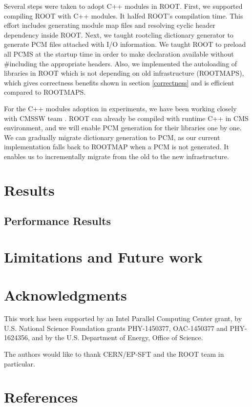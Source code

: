 \documentclass[12pt]{iopart}
\begin{document}
Several steps were taken to adopt C++ modules in ROOT. First, we supported compiling ROOT with C++ modules. It halfed ROOT's compilation time. This effort includes generating module map files and resolving cyclic header dependency inside ROOT. Next, we taught rootcling dictionary generator to generate PCM files attached with I/O information. We taught ROOT to preload all PCMS at the startup time in order to make declaration available without \#including the appropriate headers. Also, we implemented the autoloading of libraries in ROOT which is not depending on old infrastructure (ROOTMAPS), which gives correctness benefits shown in section \ref{correctness} and is efficient compared to ROOTMAPS.

For the C++ modules adoption in experiments, we have been working closely with CMSSW team \cite{cms}. ROOT can already be compiled with runtime C++ in CMS environment, and we will enable PCM generation for their libraries one by one. We can gradually migrate dictionary generation to PCM, as our current implementation falls back to ROOTMAP when a PCM is not generated. It enables us to incrementally migrate from the old to the new infrastructure.

\section{Results}
\label{results}

\subsection{Performance Results}

\section{Limitations and Future work}

\section{Acknowledgments}

This work has been supported by an Intel Parallel Computing Center grant, by U.S. National Science Foundation grants PHY-1450377, OAC-1450377 and PHY-1624356, and by the U.S. Department of Energy, Office of Science.

The authors would like to thank CERN/EP-SFT and the ROOT team in particular.


\section*{References}
\end{document}
